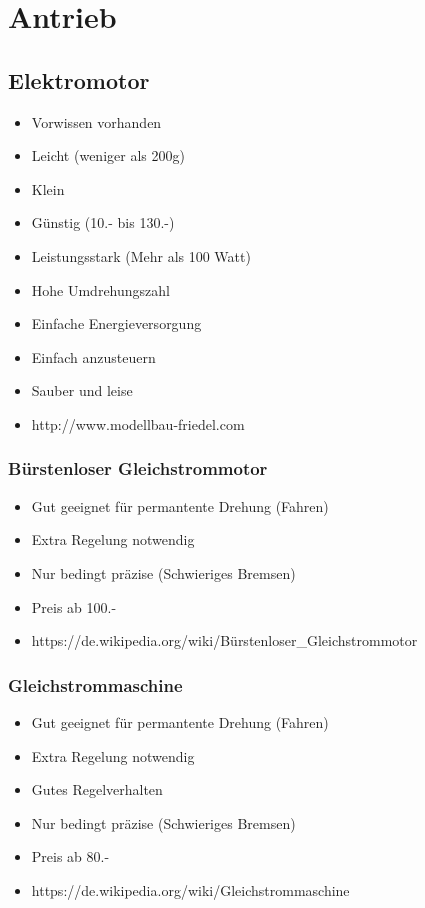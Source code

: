 \section{Antrieb}

\subsection{Elektromotor}
\begin{itemize}
\item Vorwissen vorhanden
\item Leicht (weniger als 200g)
\item Klein
\item Günstig (10.- bis 130.-)
\item Leistungsstark (Mehr als 100 Watt)
\item Hohe Umdrehungszahl
\item Einfache Energieversorgung
\item Einfach anzusteuern
\item Sauber und leise
\item http://www.modellbau-friedel.com
\end{itemize}

\subsubsection{Bürstenloser Gleichstrommotor}
\begin{itemize}
\item Gut geeignet für permantente Drehung (Fahren)
\item Extra Regelung notwendig
\item Nur bedingt präzise (Schwieriges Bremsen)
\item Preis ab 100.-
\item https://de.wikipedia.org/wiki/Bürstenloser_Gleichstrommotor
\end{itemize}

\subsubsection{Gleichstrommaschine}
\begin{itemize}
\item Gut geeignet für permantente Drehung (Fahren)
\item Extra Regelung notwendig
\item Gutes Regelverhalten
\item Nur bedingt präzise (Schwieriges Bremsen)
\item Preis ab 80.-
\item https://de.wikipedia.org/wiki/Gleichstrommaschine
\end{itemize}

